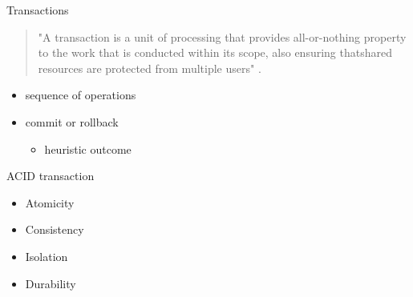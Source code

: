 \documentclass{beamer}
\begin{document}
    \begin{frame}{Transactions}
    
     \begin{quotation}
         \begin{center}
             "A transaction is a unit of processing that provides all-or-nothing property to the work that is conducted within its scope, also ensuring thatshared resources are protected from multiple users" \cite{java_transaction_processing}.
         \end{center}
     \end{quotation}
     \Large
        \begin{itemize}
            \item sequence of operations
            \item commit or rollback
            \begin{itemize}
                \item heuristic outcome
            \end{itemize}
        \end{itemize}
        \hfill \break
        \hfill \break
        
    \end{frame}
    
\begin{frame}{ACID transaction}

    \Large
    \begin{itemize}
        \item Atomicity
        \item Consistency
        \item Isolation
        \item Durability
    \end{itemize}
    \hfill \break
    \hfill \break
    \hfill \break

\end{frame}
\end{document}

